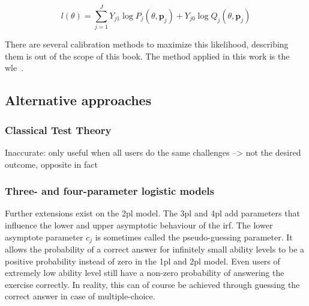 \begin{equation}
    \label{eq:wle3}
    l(\theta) = \sum_{j=1}^{J} Y_{j1} \log P_{j}(\theta, \bm{p}_j) + Y_{j0} \log Q_{j}(\theta, \bm{p}_j)
\end{equation}

There are several calibration methods to maximize this likelihood, describing them is out of the scope of this book. 
The method applied in this work is the \gls{wle}~\cite{magis2017computerized}.



\subsection{Alternative approaches}


\subsubsection{Classical Test Theory}
Inaccurate: only useful when all users do the same challenges --> not the desired outcome, opposite in fact

\subsubsection{Three- and four-parameter logistic models}
Further extensions exist on the \gls{2pl} model. 
The \gls{3pl} and \gls{4pl} add parameters that influence the lower and upper asymptotic behaviour of the \gls{irf}.
The lower asymptote parameter $c_j$ is sometimes called the pseudo-guessing parameter. 
It allows the probability of a correct answer for infinitely small ability levels to be a positive probability instead of zero in the \gls{1pl} and \gls{2pl} model. 
Even users of extremely low ability level still have a non-zero probability of answering the exercise correctly.
In reality, this can of course be achieved through guessing the correct answer in case of multiple-choice.

